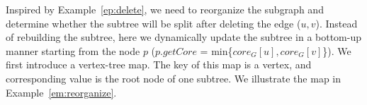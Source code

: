 Inspired by Example~\ref{ep:delete}, we need to reorganize the subgraph and determine whether the subtree will be split after deleting the edge ($u, v$). Instead of rebuilding the subtree, here we dynamically update the subtree in a bottom-up manner starting from the node $p$ ($p.getCore$ = min\{$core_G[u], core_G[v]$\}). We first introduce a vertex-tree map. The key of this map is a vertex, and corresponding value is the root node of one subtree. We illustrate the map in Example~\ref{em:reorganize}. 





